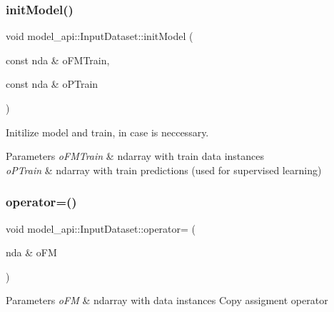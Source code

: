 \subsubsection{\texorpdfstring{init\+Model()}{initModel()}}
{\footnotesize\ttfamily void model\+\_\+api\+::\+Input\+Dataset\+::init\+Model (\begin{DoxyParamCaption}\item[{const nda \&}]{o\+F\+M\+Train,  }\item[{const nda \&}]{o\+P\+Train }\end{DoxyParamCaption})}



Initilize model and train, in case is neccessary. 


\begin{DoxyParams}{Parameters}
{\em o\+F\+M\+Train} & ndarray with train data instances \\
\hline
{\em o\+P\+Train} & ndarray with train predictions (used for supervised learning) \\
\hline
\end{DoxyParams}
\mbox{\label{classmodel__api_1_1InputDataset_a59c9f5a14675794a67ef0eafa7550d8d}} 
\subsubsection{\texorpdfstring{operator=()}{operator=()}\hspace{0.1cm}{\footnotesize\ttfamily [1/2]}}
{\footnotesize\ttfamily void model\+\_\+api\+::\+Input\+Dataset\+::operator= (\begin{DoxyParamCaption}\item[{nda \&}]{o\+FM }\end{DoxyParamCaption})}


\begin{DoxyParams}{Parameters}
{\em o\+FM} & ndarray with data instances Copy assigment operator \\
\hline
\end{DoxyParams}
\mbox{\label{classmodel__api_1_1InputDataset_a192c20a95f93e03b4c4adb07e8e5e077}} 
